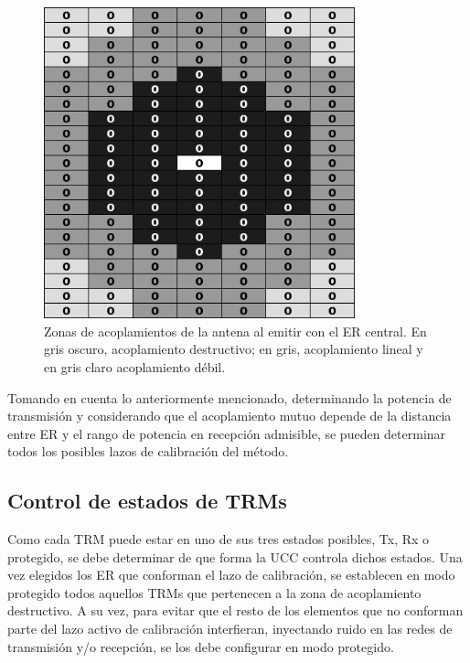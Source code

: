 \begin{figure}[H]
 \centering
 \includegraphics[width=9cm]{gfx/mutualCouplingLevels.png}
 \caption{Zonas de acoplamientos de la antena al emitir con el ER central. En gris oscuro, acoplamiento destructivo; en gris,
 acoplamiento lineal y en gris claro acoplamiento débil.}
 \label{fig:levels}
\end{figure}

Tomando en cuenta lo anteriormente mencionado, determinando la potencia de transmisión y considerando que el acoplamiento mutuo
depende de la distancia entre ER y el rango de potencia en recepción admisible, se pueden determinar todos los posibles lazos de
calibración del método.


\subsection{Control de estados de TRMs}

Como cada TRM puede estar en uno de sus tres estados posibles, Tx, Rx o protegido, se debe determinar de que forma la UCC
controla dichos estados. Una vez elegidos los ER que conforman el lazo de calibración, se establecen en modo protegido todos
aquellos TRMs que pertenecen a la zona de acoplamiento destructivo. A su vez, para evitar que el resto de los elementos que no
conforman parte del lazo activo de calibración interfieran, inyectando ruido en las redes de transmisión y/o recepción, se los
debe configurar en modo protegido. 

